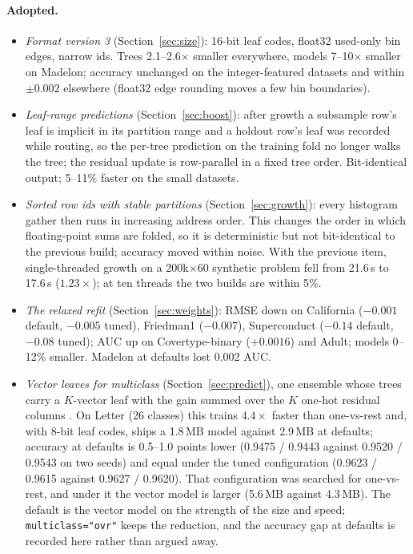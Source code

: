 \documentclass[11pt,a4paper]{article}
\newcommand{\code}[1]{\texttt{\small #1}}
\theoremstyle{definition}
\begin{document}
\paragraph{Adopted.}
\begin{itemize}[leftmargin=1.5em,itemsep=2pt]
\item \emph{Format version 3} (Section~\ref{sec:size}): 16-bit leaf codes,
float32 used-only bin edges, narrow ids. Trees 2.1--2.6$\times$ smaller
everywhere, models 7--10$\times$ smaller on Madelon; accuracy unchanged on the
integer-featured datasets and within $\pm 0.002$ elsewhere (float32 edge
rounding moves a few bin boundaries).
\item \emph{Leaf-range predictions} (Section~\ref{sec:boost}): after growth a
subsample row's leaf is implicit in its partition range and a holdout row's leaf
was recorded while routing, so the per-tree prediction on the training fold no
longer walks the tree; the residual update is row-parallel in a fixed tree
order. Bit-identical output; 5--11\% faster on the small datasets.
\item \emph{Sorted row ids with stable partitions} (Section~\ref{sec:growth}):
every histogram gather then runs in increasing address order. This changes the
order in which floating-point sums are folded, so it is deterministic but not
bit-identical to the previous build; accuracy moved within noise. With the
previous item, single-threaded growth on a 200k$\times$60 synthetic problem
fell from 21.6\,s to 17.6\,s ($1.23\times$); at ten threads the two builds are
within 5\%.
\item \emph{The relaxed refit} (Section~\ref{sec:weights}): RMSE down on
California ($-0.001$ default, $-0.005$ tuned), Friedman1 ($-0.007$),
Superconduct ($-0.14$ default, $-0.08$ tuned); AUC up on Covertype-binary
($+0.0016$) and Adult; models 0--12\% smaller. Madelon at defaults lost 0.002
AUC.
\item \emph{Vector leaves for multiclass} (Section~\ref{sec:predict}), one
ensemble whose trees carry a $K$-vector leaf with the gain summed over the $K$
one-hot residual columns \cite{ponomareva2017compact}. On Letter (26 classes)
this trains $4.4\times$ faster than one-vs-rest and, with 8-bit leaf codes,
ships a 1.8\,MB model against 2.9\,MB at defaults; accuracy at defaults is
0.5--1.0 points lower (0.9475 / 0.9443 against 0.9520 / 0.9543 on two seeds)
and equal under the tuned configuration (0.9623 / 0.9615 against 0.9627 /
0.9620). That configuration was searched for one-vs-rest, and under it the
vector model is larger (5.6\,MB against 4.3\,MB). The default is the vector
model on the strength of the size and speed; \code{multiclass="ovr"} keeps the
reduction, and the accuracy gap at defaults is recorded here rather than
argued away.
\end{itemize}
\end{document}

